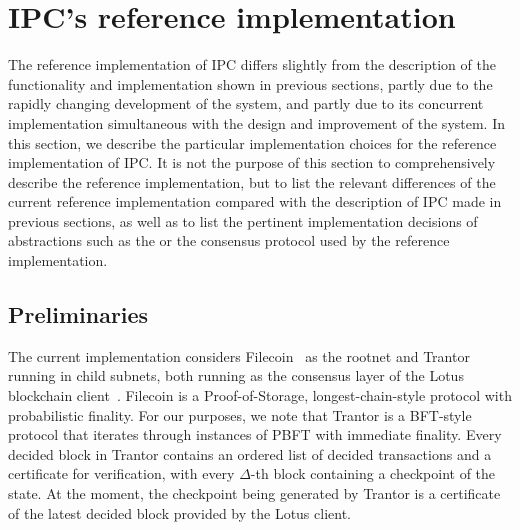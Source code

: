  \section{IPC's reference implementation}
 \label{sec:ref-impl}
 

 The reference implementation of IPC differs slightly from the description of the functionality and implementation shown in previous sections, partly due to the rapidly changing development of the system, and partly due to its concurrent implementation simultaneous with the design and improvement of the system. In this section, we describe the particular implementation choices for the reference implementation of IPC. It is not the purpose of this section to comprehensively describe the reference implementation, but to list the relevant differences of the current reference implementation compared with the description of IPC made in previous sections, as well as to list the pertinent implementation decisions of abstractions such as the \pof or the consensus protocol used by the reference implementation.

 \subsection{Preliminaries}
 The current implementation considers Filecoin~\cite{filecoin} as the rootnet and Trantor~\cite{trantor} running in child subnets, both running as the consensus layer of the Lotus blockchain client~\cite{lotus}. Filecoin is a Proof-of-Storage, longest-chain-style protocol with probabilistic finality.
 For our purposes, we note that Trantor is a BFT-style protocol that iterates through instances of PBFT \cite{castro1999practical} with immediate finality. Every decided block in Trantor contains an ordered list of decided transactions and a certificate for verification, with every $\Delta$-th block containing a checkpoint of the state. At the moment, the checkpoint being generated by Trantor is a certificate of the latest decided block provided by the Lotus client.
 
